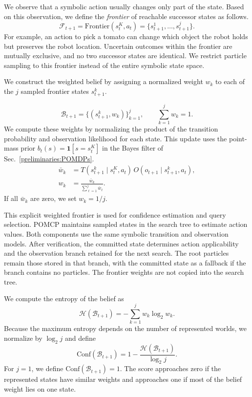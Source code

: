 We observe that a symbolic action usually changes only part of the state. Based on this observation, we define the \textit{frontier} of reachable successor states as follows.
\begin{equation}
\mathcal{F}_{t+1}
=
\mathrm{Frontier}(s_t^{K},a_t)
=
\{s_{t+1}^{1},\ldots,s_{t+1}^{j}\}.
\label{eq:frontier}
\end{equation}
For example, an action to pick a tomato can change which object the robot holds but preserves the robot location. Uncertain outcomes within the frontier are mutually exclusive, and no two successor states are identical. We restrict particle sampling to this frontier instead of the entire symbolic state space.

We construct the weighted belief by assigning a normalized weight $w_k$ to each of the $j$ sampled frontier states $s_{t+1}^{k}$.

\begin{equation}
\mathcal{B}_{t+1}
=
\{(s_{t+1}^{k},w_k)\}_{k=1}^{j},
\qquad
\sum_{k=1}^{j}w_k=1.
\label{eq:symbolic_belief}
\end{equation}
We compute these weights by normalizing the product of the transition probability and observation likelihood for each state. This update uses the point-mass prior $b_t(s)=\mathbf{1}[s=s_t^{K}]$ in the Bayes filter of Sec.~\ref{preliminaries:POMDPs}.
\begin{equation}
\begin{aligned}
\bar{w}_{k}
&=T(s_{t+1}^{k}\mid s_t^{K},a_t)\,
O(o_{t+1}\mid s_{t+1}^{k},a_t),\\
w_k&=\frac{\bar{w}_k}{\sum_{\ell=1}^{j}\bar{w}_{\ell}}.
\end{aligned}
\label{eq:belief_update}
\end{equation}
If all $\bar{w}_k$ are zero, we set $w_k=1/j$.

This explicit weighted frontier is used for confidence estimation and query selection. POMCP maintains sampled states in the search tree to estimate action values. Both components use the same symbolic transition and observation models. After verification, the committed state determines action applicability and the observation branch retained for the next search. The root particles remain those stored in that branch, with the committed state as a fallback if the branch contains no particles. The frontier weights are not copied into the search tree.

We compute the entropy of the belief as
\[
\mathcal{H}(\mathcal{B}_{t+1})
=
-\sum_{k=1}^{j}w_k\log_2 w_k.
\]
Because the maximum entropy depends on the number of represented worlds, we normalize by $\log_2 j$ and define
\begin{equation}
\mathrm{Conf}(\mathcal{B}_{t+1})
=
1-\frac{\mathcal{H}(\mathcal{B}_{t+1})}{\log_2 j}.
\label{eq:compute_confidence}
\end{equation}
For $j=1$, we define $\mathrm{Conf}(\mathcal{B}_{t+1})=1$. The score approaches zero if the represented states have similar weights and approaches one if most of the belief weight lies on one state.

